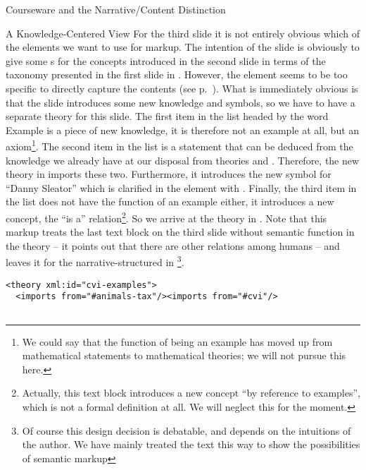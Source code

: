 \begin{omgroup}[id=courseware]{Courseware and the Narrative/Content Distinction}
\begin{omgroup}[id=courseware.knowledge-centered]{A Knowledge-Centered View}
For the third slide it is not entirely obvious which of the {\omdoc} elements we want to
use for markup. The intention of the slide is obviously to give some {s}
for the concepts introduced in the second slide in terms of the taxonomy presented in the
first slide in {}. However, the {\omdoc} {} element
seems to be too specific to directly capture the contents (see
p.~\pageref{eldef:example}). What is immediately obvious is that the slide introduces some
new knowledge and symbols, so we have to have a separate theory for this slide. The first
item in the list headed by the word Example is a piece of new knowledge, it is therefore
not an example at all, but an axiom\footnote{We could say that the function of being an
  example has moved up from mathematical statements to mathematical theories; we will not
  pursue this here.}. The second item in the list is a statement that can be deduced from
the knowledge we already have at our disposal from theories {}
and {}.  Therefore, the new theory {} in
{} imports these two. Furthermore, it introduces the new symbol
{} for ``Danny Sleator'' which is clarified in the {}
element with {}. Finally, the third item in the list does not have
the function of an example either, it introduces a new concept, the ``is a''
relation{}\footnote{Actually, this
  text block introduces a new concept ``by reference to examples'', which is not a formal
  definition at all. We will neglect this for the moment.}.  So we arrive at the theory in
{}.  Note that this markup treats the last text block on the third
slide without semantic function in the theory -- it points out that there are other
relations among humans -- and leaves it for the narrative-structured {\omdoc} in
{}\footnote{Of course this design decision is debatable,
  and depends on the intuitions of the author.  We have mainly treated the text this way
  to show the possibilities of semantic markup}.

\begin{lstlisting}[label=lst:ann-cvi-ex,
    caption={The {\omdoc} Representation for Slide 3 from {\myfigref{15-211}}},
    index={theory,imports,axiom,symbol,assertion,definition,h:p}]
<theory xml:id="cvi-examples">
  <imports from="#animals-tax"/><imports from="#cvi"/>


\end{lstlisting}
\end{omgroup}
\end{omgroup}
